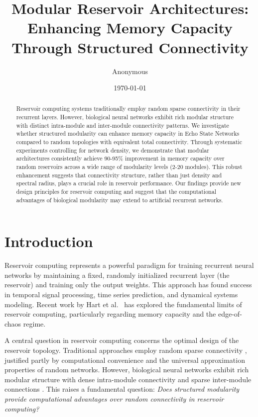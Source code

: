 \documentclass{article}
\title{Modular Reservoir Architectures: Enhancing Memory Capacity Through Structured Connectivity}
\author{Anonymous}
\date{\today}
\begin{document}
\maketitle

\begin{abstract}
Reservoir computing systems traditionally employ random sparse connectivity in their recurrent layers. However, biological neural networks exhibit rich modular structure with distinct intra-module and inter-module connectivity patterns. We investigate whether structured modularity can enhance memory capacity in Echo State Networks compared to random topologies with equivalent total connectivity. Through systematic experiments controlling for network density, we demonstrate that modular architectures consistently achieve 90-95\% improvement in memory capacity over random reservoirs across a wide range of modularity levels (2-20 modules). This robust enhancement suggests that connectivity structure, rather than just density and spectral radius, plays a crucial role in reservoir performance. Our findings provide new design principles for reservoir computing and suggest that the computational advantages of biological modularity may extend to artificial recurrent networks.
\end{abstract}

\section{Introduction}

Reservoir computing \cite{jaeger2001echo, maass2002real} represents a powerful paradigm for training recurrent neural networks by maintaining a fixed, randomly initialized recurrent layer (the reservoir) and training only the output weights. This approach has found success in temporal signal processing, time series prediction, and dynamical systems modeling. Recent work by Hart et al.~\cite{hart2021thesis, hart2022memory, hart2024arxiv} has explored the fundamental limits of reservoir computing, particularly regarding memory capacity and the edge-of-chaos regime.

A central question in reservoir computing concerns the optimal design of the reservoir topology. Traditional approaches employ random sparse connectivity \cite{jaeger2001echo}, justified partly by computational convenience and the universal approximation properties of random networks. However, biological neural networks exhibit rich modular structure with dense intra-module connectivity and sparse inter-module connections \cite{sporns2016modular}. This raises a fundamental question: \textit{Does structured modularity provide computational advantages over random connectivity in reservoir computing?}
\end{document}
